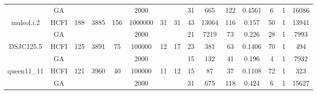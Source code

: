 \documentclass[10pt]{article}
\begin{document}
\begin{center}
\begin{table}[H]
\begin{tabular}{|c|c|c|c|c|c|c|c|c|c|c|c|c|c|c|}
	&GA&       &                   &                     &     2000    &     \cellcolor{yellow} & {\cellcolor{yellow}}& {{\cellcolor{green}31}}
&665   &122        &0.4561                   & 6                   &1          &16086        \\ \cline{2-2} \cline{6-6} \cline{9-15}
 \multirow{-2}{*}{mulsol.i.2} &HCFI   &\multirow{-2}{*}{188}   &\multirow{-2}{*}{3885}     &\multirow{-2}{*}{156}     &1000000     &\multirow{-2}{*}{\cellcolor{yellow}31}      & \multirow{-2}{*}{\cellcolor{yellow}31}    &{\cellcolor{green}43}     &13064         &116    &0.157         &50    &1     &13941        \\ \hline \hline
	&GA&       &                   &                     &     2000    &     \cellcolor{yellow} & {\cellcolor{yellow}}& {{\cellcolor{green}21}}
&7219   & 73       &0.226                   & 28                   &1          &7993        \\ \cline{2-2} \cline{6-6} \cline{9-15}
 \multirow{-2}{*}{DSJC125.5} &HCFI   &\multirow{-2}{*}{125}   &\multirow{-2}{*}{3891}     &\multirow{-2}{*}{75}     &100000     &\multirow{-2}{*}{\cellcolor{yellow}12}      & \multirow{-2}{*}{\cellcolor{yellow}17}    &{\cellcolor{green}23}     &381         &63    &0.1406         &70    & 1    &494        \\ \hline \hline
	&GA&       &                   &                     &    2000     &     \cellcolor{yellow} & {\cellcolor{yellow}}& {{\cellcolor{green}15}}
&132   &41        &0.196                   &4                    &1          &7932        \\ \cline{2-2} \cline{6-6} \cline{9-15}
 \multirow{-2}{*}{queen11\_11} &HCFI   &\multirow{-2}{*}{121}   &\multirow{-2}{*}{3960}     &\multirow{-2}{*}{40}     &100000     &\multirow{-2}{*}{\cellcolor{yellow}11}      & \multirow{-2}{*}{\cellcolor{yellow}12}    &{\cellcolor{green}15}     &87         &37    &0.1108         &72    &1     &323        \\ \hline \hline
	&GA&       &                   &                     &    2000     &     \cellcolor{yellow} & {\cellcolor{yellow}}& {{\cellcolor{green}31}}
&675   &118        &0.424                   &6                    &1          &15627        \\ \cline{2-2} \cline{6-6} \cline{9-15}

\end{tabular}
\end{table}
\end{center}
\end{document}
